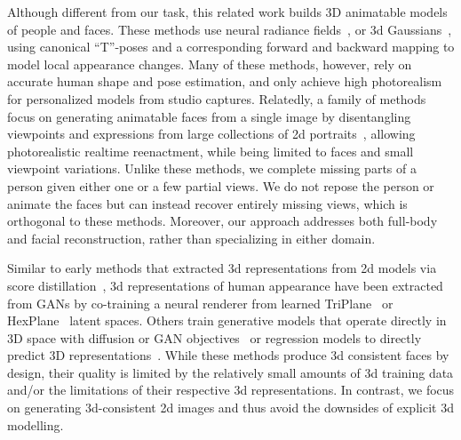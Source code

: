 \vspace{1mm}
Although different from our task, this related work builds 3D animatable models of people and faces. These methods use neural radiance fields~\cite{HumanNerf, su2023npc, su2022danbo}, or 3d Gaussians~\cite{zielonka2023drivable, qian20243dgs, wen2024gomavatar,kirschstein2023nersemble}, using canonical ``T''-poses and a corresponding forward and backward mapping to model local appearance changes.
Many of these methods, however, rely on accurate human shape and pose estimation, and only achieve high photorealism for personalized models from studio captures. 
Relatedly, a family of methods focus on generating animatable faces from a single image by disentangling viewpoints and expressions from large collections of 2d portraits~\cite{megaportraits, drobyshev2024emoportraits, zhang2023metaportrait, xu2024vasa, Nerfies, StyleGAN}, allowing photorealistic realtime reenactment, while being limited to faces and small viewpoint variations.
Unlike these methods, we complete missing parts of a person given either one or a few partial views.
We do not repose the person or animate the faces but can instead recover entirely missing views, which is orthogonal to these methods.
Moreover, our approach addresses both full-body and facial reconstruction, rather than specializing in either domain.


Similar to early methods that extracted 3d representations from 2d models via score distillation~\cite{dreamfusion,TextMesh,fantasia3d,Nerdi,ProlificDreamer,magic3d,dreambooth3d}, 3d representations of human appearance have been extracted from GANs by co-training a neural renderer from learned TriPlane~\cite{EG3D} or HexPlane~\cite{An_2023_CVPR, li2025spherehead} latent spaces.
Others train generative models that operate directly in 3D space with diffusion or GAN objectives~\cite{Rodin3DDM,muller2023diffrf,TrainOn3D1,TrainOn3D2,TrainOn3D4,TrainOn3D5} or regression models to directly predict 3D representations~\cite{PiFU,saito2020pifuhd,sengupta2024diffhuman}.
While these methods produce 3d consistent faces by design, their quality is limited by the relatively small amounts of 3d training data
and/or the limitations of their respective 3d representations.
In contrast, we focus on generating 3d-consistent 2d images and thus avoid the downsides of explicit 3d modelling.

